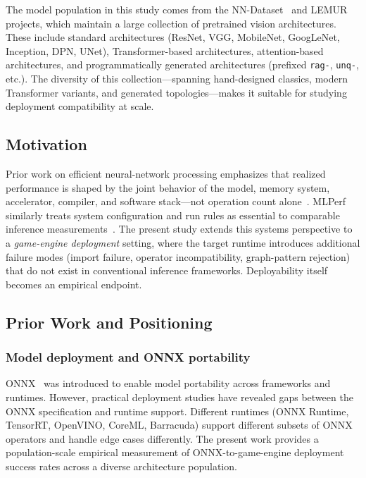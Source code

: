 \documentclass[10pt,twocolumn]{article}
\begin{document}
The model population in this study comes from the NN-Dataset~\cite{ABrain.NN-Dataset} and LEMUR~\cite{ABrain.LEMUR2} projects, which maintain a large collection of pretrained vision architectures. These include standard architectures (ResNet, VGG, MobileNet, GoogLeNet, Inception, DPN, UNet), Transformer-based architectures, attention-based architectures, and programmatically generated architectures (prefixed \texttt{rag-}, \texttt{unq-}, etc.). The diversity of this collection---spanning hand-designed classics, modern Transformer variants, and generated topologies---makes it suitable for studying deployment compatibility at scale.

\subsection{Motivation}

Prior work on efficient neural-network processing emphasizes that realized performance is shaped by the joint behavior of the model, memory system, accelerator, compiler, and software stack---not operation count alone~\cite{sze2017efficient}. MLPerf similarly treats system configuration and run rules as essential to comparable inference measurements~\cite{reddi2020mlperf}. The present study extends this systems perspective to a \emph{game-engine deployment} setting, where the target runtime introduces additional failure modes (import failure, operator incompatibility, graph-pattern rejection) that do not exist in conventional inference frameworks. Deployability itself becomes an empirical endpoint.

\subsection{Prior Work and Positioning}\label{sec:related}

\subsubsection{Model deployment and ONNX portability}

ONNX~\cite{onnx2019} was introduced to enable model portability across frameworks and runtimes. However, practical deployment studies have revealed gaps between the ONNX specification and runtime support. Different runtimes (ONNX Runtime, TensorRT, OpenVINO, CoreML, Barracuda) support different subsets of ONNX operators and handle edge cases differently. The present work provides a population-scale empirical measurement of ONNX-to-game-engine deployment success rates across a diverse architecture population.
\end{document}
